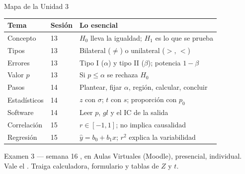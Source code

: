 \documentclass[aspectratio=169,10pt]{beamer}
\begin{document}
\begin{frame}{Mapa de la Unidad 3}
  \scriptsize
  \begin{center}
  \begin{tabular}{@{}llp{6.6cm}@{}}
    \toprule
    \textbf{Tema} & \textbf{Sesión} & \textbf{Lo esencial} \\
    \midrule
    Concepto & 13 & $H_0$ lleva la igualdad; $H_1$ es lo que se prueba \\
    Tipos & 13 & Bilateral ($\neq$) o unilateral ($>$, $<$) \\
    Errores & 13 & Tipo I ($\alpha$) y tipo II ($\beta$); potencia $1-\beta$ \\
    Valor $p$ & 13 & Si $p\le\alpha$ se rechaza $H_0$ \\
    Pasos & 14 & Plantear, fijar $\alpha$, región, calcular, concluir \\
    Estadísticos & 14 & $z$ con $\sigma$; $t$ con $s$; proporción con $p_0$ \\
    Software & 14 & Leer $p$, $gl$ y el IC de la salida \\
    Correlación & 15 & $r\in[-1,1]$; no implica causalidad \\
    Regresión & 15 & $\hat y=b_0+b_1x$; $r^{2}$ explica la variabilidad \\
    \bottomrule
  \end{tabular}
  \end{center}

  \vspace{0.1cm}
  \begin{alertblock}{Examen 3 — semana 16}
    \footnotesize
    , en Aulas Virtuales (Moodle), presencial,
    individual. Vale el . Traiga calculadora, formulario y
    tablas de $Z$ y $t$.
  \end{alertblock}
\end{frame}
\end{document}
